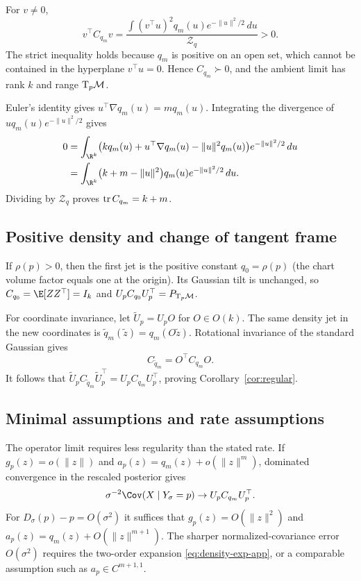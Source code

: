 For $v\ne0$,
\begin{equation}
  v^\top C_{q_m}v
  =
  \frac{\int(v^\top u)^2q_m(u)e^{-\|u\|^2/2}\,du}
  {\mathcal Z_q}>0.
\end{equation}
The strict inequality holds because $q_m$ is positive on an open set, which cannot be contained in the hyperplane $v^\top u=0$.  Hence $C_{q_m}\succ0$, and the ambient limit has rank $k$ and range $\mathrm{T}_p\mathcal{M}$.

Euler's identity gives $u^\top\nabla q_m(u)=m q_m(u)$.  Integrating the divergence of $u q_m(u)e^{-\|u\|^2/2}$ gives
\begin{align}
  0
  &=
  \int_{\R^k}
  \bigl(kq_m(u)+u^\top\nabla q_m(u)-\|u\|^2q_m(u)\bigr)
  e^{-\|u\|^2/2}\,du\\
  &=
  \int_{\R^k}
  \bigl(k+m-\|u\|^2\bigr)q_m(u)e^{-\|u\|^2/2}\,du.
\end{align}
Dividing by $\mathcal Z_q$ proves $\operatorname{tr} C_{q_m}=k+m$.

\subsection{Positive density and change of tangent frame}

If $\rho(p)>0$, then the first jet is the positive constant
$q_0=\rho(p)$ (the chart volume factor equals one at the origin).  Its
Gaussian tilt is unchanged, so $C_{q_0}=\E[ZZ^\top]=I_k$ and
$U_pC_{q_0}U_p^\top=P_{\mathrm{T}_p\mathcal{M}}$.

For coordinate invariance, let $\widetilde U_p=U_pO$ for $O\in O(k)$.
The same density jet in the new coordinates is
$\widetilde q_m(\widetilde z)=q_m(O\widetilde z)$.  Rotational invariance of
the standard Gaussian gives
\[
  C_{\widetilde q_m}=O^\top C_{q_m}O.
\]
It follows that
$\widetilde U_pC_{\widetilde q_m}\widetilde U_p^\top
=U_pC_{q_m}U_p^\top$, proving Corollary~\ref{cor:regular}.

\subsection{Minimal assumptions and rate assumptions}

The operator limit requires less regularity than the stated rate.  If
$g_p(z)=o(\|z\|)$ and $a_p(z)=q_m(z)+o(\|z\|^m)$, dominated convergence in the rescaled posterior gives
\[
  \sigma^{-2}\Cov(X\mid Y_\sigma=p)\to U_pC_{q_m}U_p^\top.
\]
For $D_\sigma(p)-p=O(\sigma^2)$ it suffices that $g_p(z)=O(\|z\|^2)$ and
$a_p(z)=q_m(z)+O(\|z\|^{m+1})$.  The sharper normalized-covariance error
$O(\sigma^2)$ requires the two-order expansion \eqref{eq:density-exp-app}, or a comparable assumption such as $a_p\in C^{m+1,1}$.

